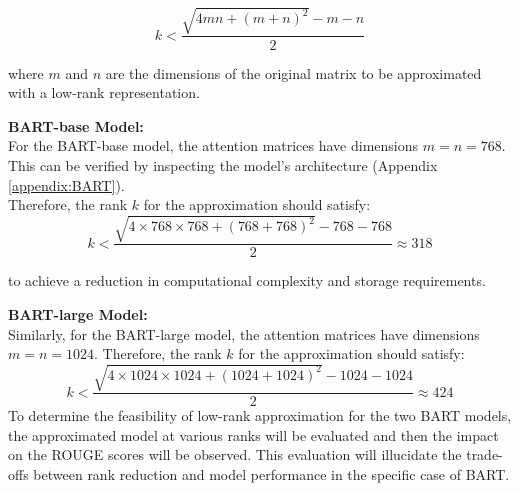             \[
            k < \frac{\sqrt{4mn + (m+n)^2} - m - n}{2}
            \]
            
            where \(m\) and \(n\) are the dimensions of the original matrix to be approximated with a low-rank representation.
            
            \textbf{BART-base Model:}\\
            For the BART-base model, the attention matrices have dimensions \(m = n = 768\). This can be verified by inspecting the model's architecture (Appendix \ref{appendix:BART}).\\
            Therefore, the rank \(k\) for the approximation should satisfy:
            \[
            k < \frac{\sqrt{4 \times 768 \times 768 + (768 + 768)^2} - 768 - 768}{2} \approx 318
            \]
            
            \label{appropriate_rank}to achieve a reduction in computational complexity and storage requirements.

            \textbf{BART-large Model:}\\
            Similarly, for the BART-large model, the attention matrices have dimensions \(m = n = 1024\). Therefore, the rank \(k\) for the approximation should satisfy:
            \[
            k < \frac{\sqrt{4 \times 1024 \times 1024 + (1024 + 1024)^2} - 1024 - 1024}{2} \approx 424
            \]
            To determine the feasibility of low-rank approximation for the two BART models, the approximated model at various ranks will be evaluated and then the impact on the ROUGE scores will be observed. This evaluation will illucidate the trade-offs between rank reduction and model performance in the specific case of BART.

